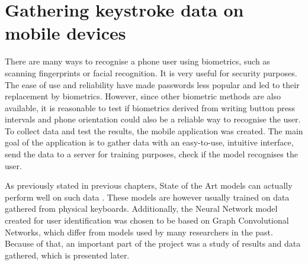 
\chapter{Gathering keystroke data on mobile devices}

There are many ways to recognise a phone user using biometrics, such as scanning fingerprints or facial recognition. It is very useful for security purposes. The ease of use and reliability have made passwords less popular and led to their replacement by biometrics. However, since other biometric methods are also available, it is reasonable to test if biometrics derived from writing button press intervals and phone orientation could also be a reliable way to recognise the user. To collect data and test the results, the mobile application was created.
The main goal of the application is to gather data with an easy-to-use, intuitive interface, send the data to a server for training purposes, check if the model recognises the user. 

As previously stated in previous chapters, State of the Art models can actually perform well on such data \cite{Lu2020}. These models are however usually trained on data gathered from physical keyboards. Additionally, the Neural Network model created for user identification was chosen to be based on Graph Convolutional Networks, which differ from models used by many researchers in the past.
Because of that, an important part of the project was a study of results and data gathered, which is presented later.


